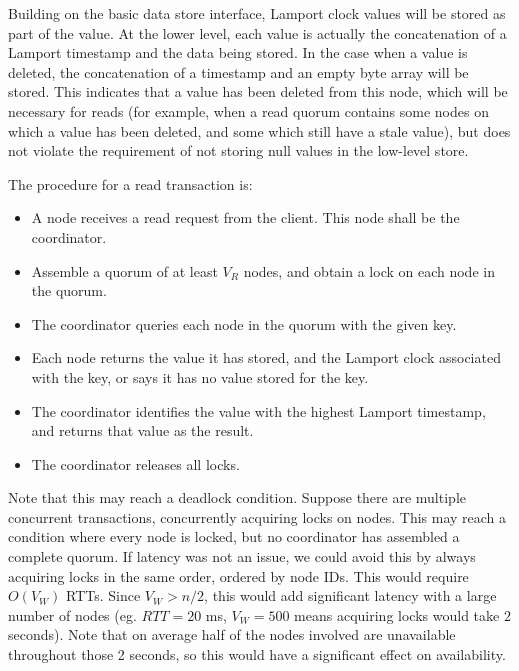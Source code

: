 \documentclass[12pt,a4paper,twoside,openright]{report}
\begin{document}
Building on the basic data store interface, Lamport clock values will be stored as part of the value. At the lower level, each value is actually the concatenation of a Lamport timestamp and the data being stored. In the case when a value is deleted, the concatenation of a timestamp and an empty byte array will be stored. This indicates that a value has been deleted from this node, which will be necessary for reads (for example, when a read quorum contains some nodes on which a value has been deleted, and some which still have a stale value), but does not violate the requirement of not storing null values in the low-level store.

The procedure for a read transaction is:

\begin{itemize}
\item
A node receives a read request from the client. This node shall be the coordinator.

\item
Assemble a quorum of at least $V_R$ nodes, and obtain a lock on each node in the quorum.

\item
The coordinator queries each node in the quorum with the given key.

\item
Each node returns the value it has stored, and the Lamport clock associated with the key, or says it has no value stored for the key.

\item
The coordinator identifies the value with the highest Lamport timestamp, and returns that value as the result.

\item
The coordinator releases all locks.

\end{itemize}

Note that this may reach a deadlock condition. Suppose there are multiple concurrent transactions, concurrently acquiring locks on nodes. This may reach a condition where every node is locked, but no coordinator has assembled a complete quorum. If latency was not an issue, we could avoid this by always acquiring locks in the same order, ordered by node IDs. This would require $O(V_W)$ RTTs. Since $V_W > n / 2$, this would add significant latency with a large number of nodes (eg. $RTT = 20$ ms, $V_W = 500$ means acquiring locks would take $2$ seconds). Note that on average half of the nodes involved are unavailable throughout those 2 seconds, so this would have a significant effect on availability.
\end{document}
